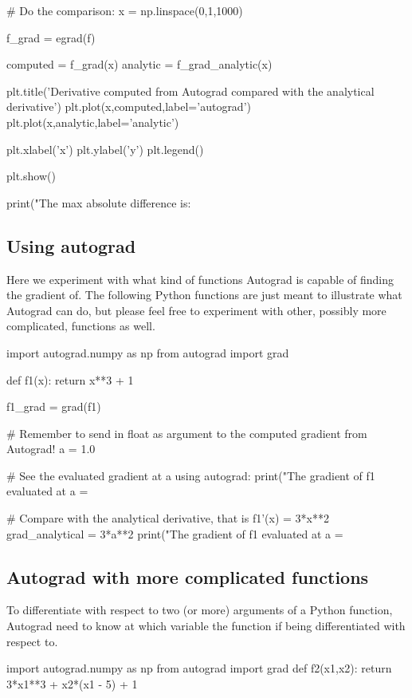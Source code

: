 \documentclass[%
oneside,                 %
final,                   %
10pt]{article}
\begin{document}
# Do the comparison:
x = np.linspace(0,1,1000)

f_grad = egrad(f)

computed = f_grad(x)
analytic = f_grad_analytic(x)

plt.title('Derivative computed from Autograd compared with the analytical derivative')
plt.plot(x,computed,label='autograd')
plt.plot(x,analytic,label='analytic')

plt.xlabel('x')
plt.ylabel('y')
plt.legend()

plt.show()

print("The max absolute difference is: %
\epycod

\subsection{Using autograd}

Here we
experiment with what kind of functions Autograd is capable
of finding the gradient of. The following Python functions are just
meant to illustrate what Autograd can do, but please feel free to
experiment with other, possibly more complicated, functions as well.

\bpycod
import autograd.numpy as np
from autograd import grad

def f1(x):
    return x**3 + 1

f1_grad = grad(f1)

# Remember to send in float as argument to the computed gradient from Autograd!
a = 1.0

# See the evaluated gradient at a using autograd:
print("The gradient of f1 evaluated at a = %

# Compare with the analytical derivative, that is f1'(x) = 3*x**2 
grad_analytical = 3*a**2
print("The gradient of f1 evaluated at a = %
\epycod


\subsection{Autograd with more complicated functions}

To differentiate with respect to two (or more) arguments of a Python
function, Autograd need to know at which variable the function if
being differentiated with respect to.

\bpycod
import autograd.numpy as np
from autograd import grad
def f2(x1,x2):
    return 3*x1**3 + x2*(x1 - 5) + 1
\end{document}
